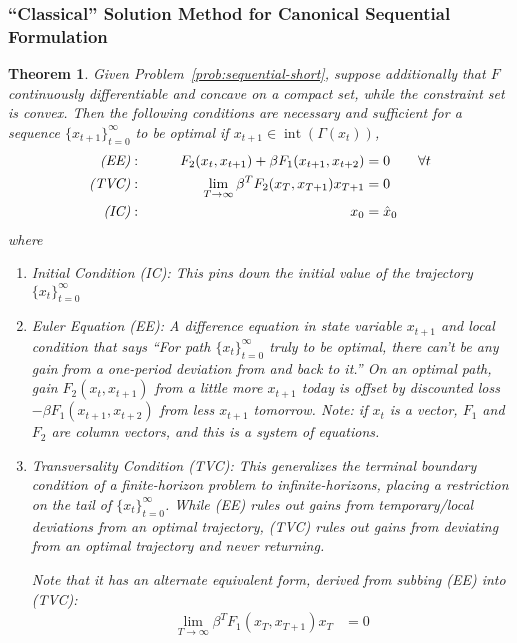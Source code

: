 \documentclass[12pt]{book}
\numberwithin{equation}{section} %
\theoremstyle{plain}
\newtheorem{thm}{Theorem}[section]
\theoremstyle{definition}
\theoremstyle{remark}
\newcommand{\ra}{\rightarrow}
\newcommand{\interior}{\operatorname{int}}
\newcommand{\tinfz}{_{t=0}^\infty}
\begin{document}
\clearpage
\subsubsection{``Classical'' Solution Method for Canonical Sequential
Formulation}

\begin{thm}
Given Problem~\ref{prob:sequential-short}, suppose additionally that $F$
continuously differentiable and concave on a compact set, while the
constraint set is convex.
Then the following conditions are necessary and sufficient for a
sequence $\{x_{t+1}\}\tinfz$ to be optimal if $x_{t+1}\in
\interior(\Gamma(x_t))$,
\begin{alignat*}{3}
  \text{\emph{(EE)}}:&&
  \qquad
  F_2(x_{t},x_{t+1}) + \beta F_1(x_{t+1},x_{t+2})
  &= 0
  \qquad\forall t
  \\
  \text{\emph{(TVC)}}:&&
  \lim_{T\ra\infty}
  \beta^T F_2(x_{T},x_{T+1})
  x_{T+1}
  &= 0
  \\
  \text{\emph{(IC)}}:&&
  x_0 &= \hat{x}_0
\end{alignat*}
where
\begin{enumerate}[label=\emph{(\roman*)}]
  \item \emph{Initial Condition (IC):} This pins down the initial value
    of the trajectory $\{x_t\}\tinfz$
  \item \emph{Euler Equation (EE):}
    A difference equation in state variable $x_{t+1}$ and local
    condition that says ``For path $\{x_t\}\tinfz$ truly to be optimal,
    there can't be any gain from a one-period deviation from and back to
    it.''
    On an optimal path, gain $F_2(x_t,x_{t+1})$ from a little more
    $x_{t+1}$ today is offset by discounted loss $-\beta
    F_1(x_{t+1},x_{t+2})$ from less $x_{t+1}$ tomorrow.
    Note: if $x_t$ is a vector, $F_1$ and $F_2$ are column vectors, and
    this is a system of equations.

  \item \emph{Transversality Condition (TVC):}
    This generalizes the \emph{terminal boundary condition} of a
    finite-horizon problem to infinite-horizons, placing a
    restriction on the tail of $\{x_t\}\tinfz$.
    While (EE) rules out gains from temporary/local deviations from an
    optimal trajectory, (TVC) rules out gains from deviating from an
    optimal trajectory and \emph{never returning}.

    Note that it has an alternate equivalent form, derived from subbing
    (EE) into (TVC):
      \begin{align*}
        \lim_{T\ra\infty}
        \beta^{T}
        F_1(x_{T},x_{T+1})
        x_{T}
        &= 0
      \end{align*}
\end{enumerate}
\end{thm}
\end{document}
